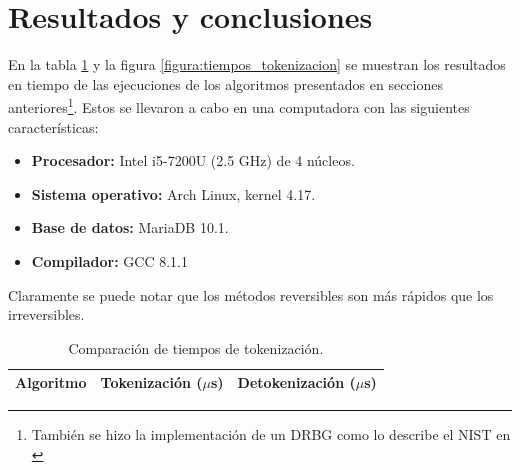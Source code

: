 %
%
%

\section{Resultados y conclusiones}

En la tabla \ref{tabla:tiempos_tokenizacion} y la figura
\ref{figura:tiempos_tokenizacion} se muestran los resultados en tiempo de
las ejecuciones de los algoritmos presentados en secciones
anteriores\footnote{También se hizo la implementación de un DRBG como lo
describe el NIST en \cite{nist_aleatorios}}. Estos se llevaron a cabo en una
computadora con las siguientes características:

\begin{itemize}
  \item \textbf{Procesador:} Intel i5-7200U (2.5 GHz) de 4 núcleos.
  \item \textbf{Sistema operativo:} Arch Linux, kernel 4.17.
  \item \textbf{Base de datos:} MariaDB 10.1.
  \item \textbf{Compilador:} GCC 8.1.1
\end{itemize}


Claramente se puede notar que los métodos reversibles son más rápidos que los
irreversibles. 

\begin{table}
  \begin{center}
    \caption{Comparación de tiempos de tokenización.}
    \label{tabla:tiempos_tokenizacion}
    \begin{tabular}{|c|c|c|}
      \hline
      Algoritmo & Tokenización ($\mu$s) & Detokenización ($\mu$s) \\
      \hline
      
    \end{tabular}
  \end{center}
\end{table}

